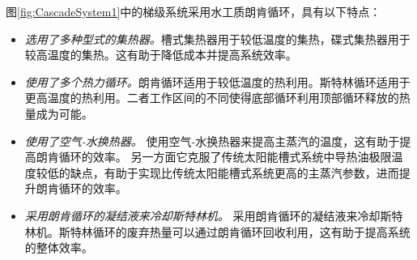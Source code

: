 图\ref{fig:CascadeSystem1}中的梯级系统采用水工质朗肯循环，具有以下特点：
\begin{itemize}
  \item \emph{选用了多种型式的集热器。}槽式集热器用于较低温度的集热，碟式集热器用于较高温度的集热。这有助于降低成本并提高系统效率。
  \item \emph{使用了多个热力循环。}朗肯循环适用于较低温度的热利用。斯特林循环适用于更高温度的热利用。二者工作区间的不同使得底部循环利用顶部循环释放的热量成为可能。
  \item \emph{使用了空气-水换热器。} 使用空气-水换热器来提高主蒸汽的温度，这有助于提高朗肯循环的效率。 另一方面它克服了传统太阳能槽式系统中导热油极限温度较低的缺点，有助于实现比传统太阳能槽式系统更高的主蒸汽参数，进而提升朗肯循环的效率。 
  \item \emph{采用朗肯循环的凝结液来冷却斯特林机。} 采用朗肯循环的凝结液来冷却斯特林机。斯特林循环的废弃热量可以通过朗肯循环回收利用，这有助于提高系统的整体效率。
\end{itemize}


